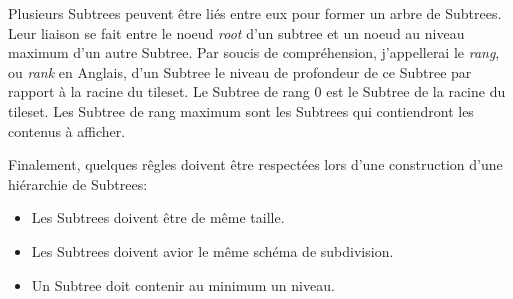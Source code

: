 Plusieurs Subtrees peuvent être liés entre eux pour former un arbre de Subtrees. Leur liaison se fait entre le noeud \textit{root} d'un subtree et un noeud au niveau maximum d'un autre Subtree. Par soucis de compréhension, j'appellerai le \textit{rang}, ou \textit{rank} en Anglais, d'un Subtree le niveau de profondeur de ce Subtree par rapport à la racine du tileset. Le Subtree de rang 0 est le Subtree de la racine du tileset. Les Subtree de rang maximum sont les Subtrees qui contiendront les contenus à afficher.

Finalement, quelques rêgles doivent être respectées lors d'une construction d'une hiérarchie de Subtrees:

\begin{itemize}
    \item Les Subtrees doivent être de même taille.
    \item Les Subtrees doivent avior le même schéma de subdivision.
    \item Un Subtree doit contenir au minimum un niveau.
\end{itemize}